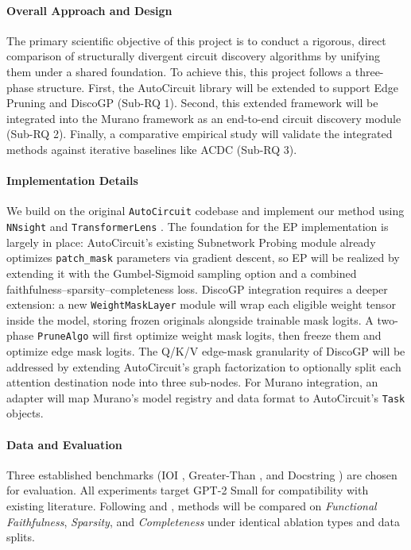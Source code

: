 \documentclass[
    IMRAD=false,
	english,
	ruledheaders=section, %
	class=report, %
	thesis={type=bachelor}, %
	accentcolor=9c, %
	custommargins=false,%
	marginpar=false,%
	parskip=half,%
	fontsize=11pt,%
]{tudapub}
\begin{document}
\paragraph{Overall Approach and Design} The primary scientific objective of this project is to conduct a rigorous, direct comparison of structurally divergent circuit discovery algorithms by unifying them under a shared foundation. To achieve this, this project follows a three-phase structure. First, the AutoCircuit library \citep{miller2024transformer} will be extended to support Edge Pruning \citep{edgePruning} and DiscoGP \citep{yu-etal-2025-sheaf} (Sub-RQ 1). Second, this extended framework will be integrated into the Murano framework as an end-to-end circuit discovery module (Sub-RQ 2). Finally, a comparative empirical study will validate the integrated methods against iterative baselines like ACDC \citep{acdc} (Sub-RQ 3).

\paragraph{Implementation Details} We build on the original \texttt{AutoCircuit} codebase and implement our method using \texttt{NNsight} \citep{nnsight} and \texttt{TransformerLens} \citep{nanda2022transformerlens}. The foundation for the EP implementation is largely in place: AutoCircuit's existing Subnetwork Probing module already optimizes \texttt{patch\_mask} parameters via gradient descent, so EP will be realized by extending it with the Gumbel-Sigmoid sampling option and a combined faithfulness--sparsity--completeness loss. DiscoGP integration requires a deeper extension: a new \texttt{WeightMaskLayer} module will wrap each eligible weight tensor inside the model, storing frozen originals alongside trainable mask logits. A two-phase \texttt{PruneAlgo} will first optimize weight mask logits, then freeze them and optimize edge mask logits. The Q/K/V edge-mask granularity of DiscoGP will be addressed by extending AutoCircuit's graph factorization to optionally split each attention destination node into three sub-nodes. For Murano integration, an adapter will map Murano's model registry and data format to AutoCircuit's \texttt{Task} objects.

\paragraph{Data and Evaluation} Three established benchmarks (IOI \citep{wang2023interpretability}, Greater-Than \citep{hanna2023doesgpt2computegreaterthan}, and Docstring \citep{stefanhex_janiak_2023}) are chosen for evaluation. All experiments target GPT-2 Small \citep{gpt2} for compatibility with existing literature. Following \citet{miller2024transformer} and \citet{yu-etal-2025-sheaf}, methods will be compared on \textit{Functional Faithfulness}, \textit{Sparsity}, and \textit{Completeness} under identical ablation types and data splits.
\end{document}
